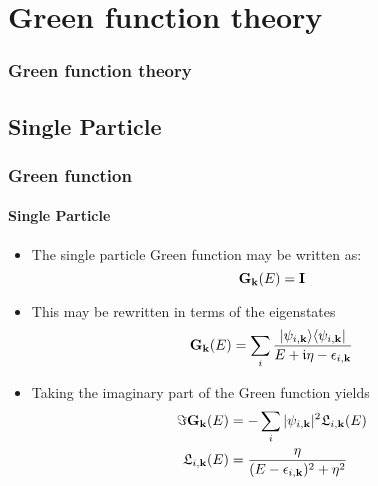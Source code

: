 \section{Green function theory}

\begin{framenologo}
  \frametitle{Green function theory}
  \tableofcontents[currentsection]
\end{framenologo}

\subsection{Single Particle}

\begin{frame}
  \frametitle{Green function}
  \framesubtitle{Single Particle}

  \begin{itemize}[<+->]
    \item %
    The single particle Green function may be written as:
    \begin{equation*}
      [(E+\im\eta)\ID - \HH_\kk]\G_\kk(E) = \ID
    \end{equation*}
    
    \item%
    This may be rewritten in terms of the eigenstates
    \begin{equation*}
      \mathbf{G}_{\mathbf{k}}(E) = \sum_i \frac{|\psi_{i,\mathbf{k}}\rangle\langle \psi_{i,\mathbf{k}}|}{E+\mathfrak{i}\eta-\epsilon_{i,\mathbf{k}}}
    \end{equation*}

    \item%
    Taking the imaginary part of the Green function yields
    \begin{align*}
      \Im \mathbf{G}_{\mathbf{k}}(E) &= -\sum_i |\psi_{i,\mathbf{k}}|^2\mathfrak{L}_{i,\mathbf{k}}(E)
      \\
      \mathfrak{L}_{i,\mathbf{k}}(E) &= \frac{\eta}{(E-\epsilon_{i,\mathbf{k}})^2 + \eta^2}
    \end{align*}
    
  \end{itemize}

\end{frame}


